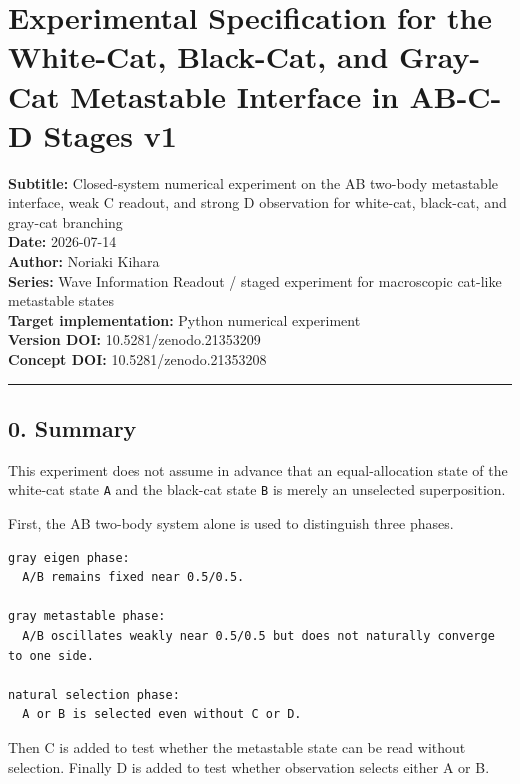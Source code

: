 \documentclass{article}
\begin{document}
\section{Experimental Specification for the White-Cat, Black-Cat, and
Gray-Cat Metastable Interface in AB-C-D Stages
v1}\label{experimental-specification-for-the-white-cat-black-cat-and-gray-cat-metastable-interface-in-ab-c-d-stages-v1}

\textbf{Subtitle:} Closed-system numerical experiment on the AB two-body
metastable interface, weak C readout, and strong D observation for
white-cat, black-cat, and gray-cat branching\\
\textbf{Date:} 2026-07-14\\
\textbf{Author:} Noriaki Kihara\\
\textbf{Series:} Wave Information Readout / staged experiment for
macroscopic cat-like metastable states\\
\textbf{Target implementation:} Python numerical experiment\\
\textbf{Version DOI:} 10.5281/zenodo.21353209\\
\textbf{Concept DOI:} 10.5281/zenodo.21353208

\begin{center}\rule{0.5\linewidth}{0.5pt}\end{center}

\subsection{0. Summary}\label{summary}

This experiment does not assume in advance that an equal-allocation
state of the white-cat state \texttt{A} and the black-cat state
\texttt{B} is merely an unselected superposition.

First, the AB two-body system alone is used to distinguish three phases.

\begin{verbatim}
gray eigen phase:
  A/B remains fixed near 0.5/0.5.

gray metastable phase:
  A/B oscillates weakly near 0.5/0.5 but does not naturally converge to one side.

natural selection phase:
  A or B is selected even without C or D.
\end{verbatim}

Then C is added to test whether the metastable state can be read without
selection. Finally D is added to test whether observation selects either
A or B.
\end{document}

